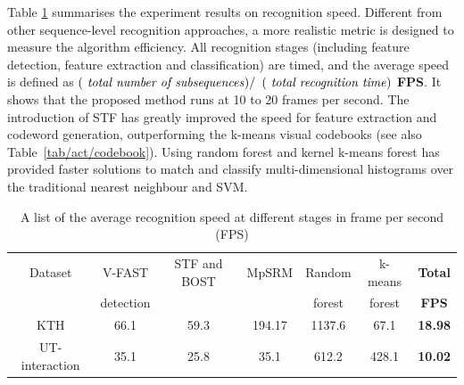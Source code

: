 Table \ref{tab/act/speed} summarises the experiment results on recognition speed. Different from other sequence-level recognition approaches, a more realistic metric is designed to measure the algorithm efficiency. All recognition stages (including feature detection, feature extraction and classification) are timed, and the average speed is defined as $(\mbox{\textit{ total number of subsequences}})/$ $(\mbox{\textit{ total recognition time}})$ \textbf{FPS}. It shows that the proposed method runs at 10 to 20 frames per second. The introduction of STF has greatly improved the speed for feature extraction and codeword generation, outperforming the k-means visual codebooks (see also Table~\ref{tab/act/codebook}). Using random forest and kernel k-means forest has provided faster solutions to match and classify multi-dimensional histograms over the traditional nearest neighbour and SVM. 
\begin{table}
\centering
{\footnotesize
\begin{tabular}{|c|c|c|c|c|c|c|}
\hline
Dataset & V-FAST & STF and BOST & MpSRM & Random & k-means & \textbf{ Total }\\
 & detection &   &  & forest & forest & \textbf{ FPS}\\
\hline
KTH & 66.1 & 59.3 & 194.17 & 1137.6 & 67.1 & \textbf{ 18.98 } \\
UT-interaction & 35.1 & 25.8 & 35.1 & 612.2 & 428.1 & \textbf{ 10.02 } \\
\hline
\end{tabular}
}
\caption{A list of the average recognition speed at different stages in frame per second (FPS)}
\label{tab/act/speed}
\end{table}
